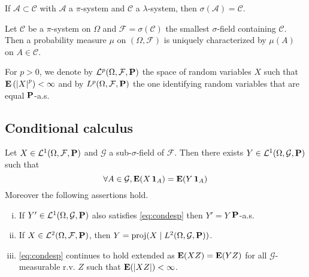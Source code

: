 \begin{thm}
	If $\mathcal{A} \subset \mathcal{C}$ with $\mathcal{A}$ a $\pi$-system and $\mathcal{C}$ a $\lambda$-system, then $\sigma(\mathcal{A}) = \mathcal{C}$.
\end{thm}

\begin{thm}
	Let $\mathcal{C}$ be a $\pi$-system on $\Omega$ and $\mathcal{F} = \sigma(\mathcal{C})$ the smallest $\sigma$-field containing $\mathcal{C}$.
	Then a probability measure $\mu$ on $(\Omega, \mathcal{F})$ is uniquely characterized by $\mu(A)$ on $A \in \mathcal{C}$.
\end{thm}

\begin{note}
	For $p > 0$, we denote by $\mathcal{L}^p(\Omega, \mathcal{F}, \mathbf{P})$ the space of random variables $X$ such that $\mathbf{E} \left( \left\lvert X\right\rvert^p \right) < \infty$ and by $L^p(\Omega, \mathcal{F}, \mathbf{P})$ the one identifying random variables that are equal $\mathbf{P}$-a.s.
\end{note}


\subsection{Conditional calculus}

	\begin{lem}
		Let $X \in \mathcal{L}^1(\Omega, \mathcal{F}, \mathbf{P})$ and $\mathcal{G}$ a sub-$\sigma$-field of $\mathcal{F}$.
		Then there exists $Y \in \mathcal{L}^1(\Omega, \mathcal{G}, \mathbf{P})$ such that
		\begin{equation}\label{eq:condesp}
			\forall A \in \mathcal{G}, \mathbf{E}(X \operatorname{\mathbf{1}}_A) = \mathbf{E}(Y \operatorname{\mathbf{1}}_A)
		\end{equation}
		Moreover the following assertions hold.
		\begin{enumerate}[(i)]
			\item If $Y' \in \mathcal{L}^1(\Omega, \mathcal{G}, \mathbf{P})$ also satisfies \eqref{eq:condesp} then $Y' = Y$ $\mathbf{P}$-a.s.
			\item If $X \in \mathcal{L}^2(\Omega, \mathcal{F}, \mathbf{P})$, then $Y = \operatorname{proj}(X \mid L^2(\Omega, \mathcal{G}, \mathbf{P}))$.
			\item \eqref{eq:condesp} continues to hold extended as $\mathbf{E}(XZ) = \mathbf{E}(YZ)$ for all $\mathcal{G}$-measurable r.v. $Z$ such that $\mathbf{E}(\left\lvert XZ\right\rvert) < \infty$.
		\end{enumerate}
	\end{lem}

